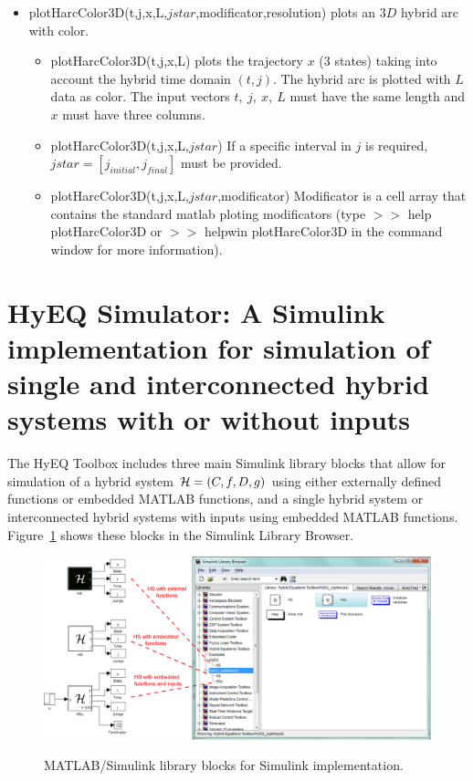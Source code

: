 \documentclass{article}
\begin{document}
\begin{itemize}
\item plotHarcColor3D(t,j,x,L,$jstar$,modificator,resolution) plots an $3D$ hybrid arc with color.
\begin{itemize}
\item plotHarcColor3D(t,j,x,L) plots the trajectory $x$ (3 states) taking into account the hybrid time domain $(t,j)$. The hybrid arc is plotted with $L$ data as color. The input vectors $t,\ j,\ x,\ L$ must have the same length and $x$ must have three columns.
\item plotHarcColor3D(t,j,x,L,$jstar$) If a specific interval in $j$ is required, $jstar = [j_{initial},
 j_{final}]$ must be provided.
 \item plotHarcColor3D(t,j,x,L,$jstar$,modificator) Modificator is a cell array that contains the standard matlab ploting modificators (type $>>$ help plotHarcColor3D or $>>$ helpwin plotHarcColor3D in the command window for more information).
\end{itemize}
\end{itemize}

\section{HyEQ Simulator: A Simulink implementation for simulation of single and interconnected hybrid systems with or without inputs}
\label{sec:HyEQsimulator}

The HyEQ Toolbox includes three main Simulink library blocks that allow for simulation of a hybrid system $\mathcal{H} =(C,f,D,g)$ using either externally defined functions or embedded MATLAB functions, and a single hybrid system or interconnected hybrid systems with inputs using embedded MATLAB functions. Figure~\ref{fig:Simulinklibblocks} shows these blocks in the Simulink Library Browser.

\begin{figure}[ht]
  \begin{center}
    {\includegraphics[width=1\textwidth]{figures/Simulink/Simulinkimplementation.eps}}
\caption{MATLAB/Simulink library blocks for Simulink implementation.}
\label{fig:Simulinklibblocks}
  \end{center}
\end{figure}
\end{document}

